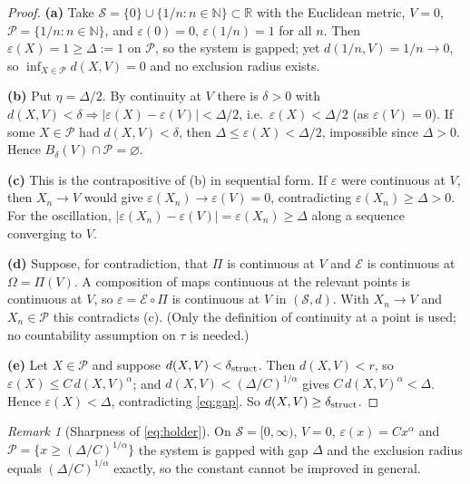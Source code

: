 \documentclass[11pt,a4paper]{article}
\theoremstyle{definition}
\theoremstyle{remark}
\newtheorem{remark}{Remark}
\newcommand{\Pset}{\mathcal{P}}
\begin{document}
\begin{proof}
\textbf{(a)} Take $\mathcal S=\{0\}\cup\{1/n:n\in\mathbb N\}\subset\mathbb R$ with the Euclidean metric, $V=0$, $\Pset=\{1/n:n\in\mathbb N\}$, and $\varepsilon(0)=0$, $\varepsilon(1/n)=1$ for all $n$. Then $\varepsilon(X)=1\ge\Delta:=1$ on $\Pset$, so the system is gapped; yet $d(1/n,V)=1/n\to0$, so $\inf_{X\in\Pset}d(X,V)=0$ and no exclusion radius exists.

\textbf{(b)} Put $\eta=\Delta/2$. By continuity at $V$ there is $\delta>0$ with $d(X,V)<\delta\Rightarrow|\varepsilon(X)-\varepsilon(V)|<\Delta/2$, i.e.\ $\varepsilon(X)<\Delta/2$ (as $\varepsilon(V)=0$). If some $X\in\Pset$ had $d(X,V)<\delta$, then $\Delta\le\varepsilon(X)<\Delta/2$, impossible since $\Delta>0$. Hence $B_\delta(V)\cap\Pset=\varnothing$.

\textbf{(c)} This is the contrapositive of (b) in sequential form. If $\varepsilon$ were continuous at $V$, then $X_n\to V$ would give $\varepsilon(X_n)\to\varepsilon(V)=0$, contradicting $\varepsilon(X_n)\ge\Delta>0$. For the oscillation, $|\varepsilon(X_n)-\varepsilon(V)|=\varepsilon(X_n)\ge\Delta$ along a sequence converging to $V$.

\textbf{(d)} Suppose, for contradiction, that $\Pi$ is continuous at $V$ and $\mathcal E$ is continuous at $\Omega=\Pi(V)$. A composition of maps continuous at the relevant points is continuous at $V$, so $\varepsilon=\mathcal E\circ\Pi$ is continuous at $V$ in $(\mathcal S,d)$. With $X_n\to V$ and $X_n\in\Pset$ this contradicts (c). (Only the definition of continuity at a point is used; no countability assumption on $\tau$ is needed.)

\textbf{(e)} Let $X\in\Pset$ and suppose $d(X,V)<\delta_{\rm struct}$. Then $d(X,V)<r$, so $\varepsilon(X)\le C\,d(X,V)^\alpha$; and $d(X,V)<(\Delta/C)^{1/\alpha}$ gives $C\,d(X,V)^\alpha<\Delta$. Hence $\varepsilon(X)<\Delta$, contradicting \eqref{eq:gap}. So $d(X,V)\ge\delta_{\rm struct}$.
\end{proof}

\begin{remark}[Sharpness of \eqref{eq:holder}]
On $\mathcal S=[0,\infty)$, $V=0$, $\varepsilon(x)=Cx^\alpha$ and $\Pset=\{x\ge(\Delta/C)^{1/\alpha}\}$ the system is gapped with gap $\Delta$ and the exclusion radius equals $(\Delta/C)^{1/\alpha}$ exactly, so the constant cannot be improved in general.
\end{remark}
\end{document}
